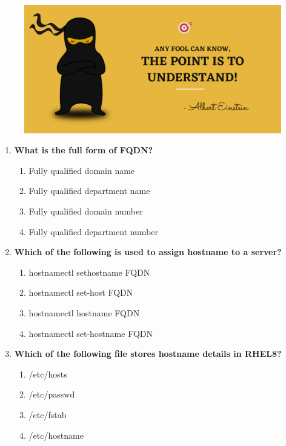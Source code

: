 \setlength{\columnsep}{3pt}
\begin{flushleft}
	
	\paragraph{}
	\bigskip
	
	\begin{figure}[h!]
		\centering
		\includegraphics[scale=.2]{content/practise.jpg}
	\end{figure}	
	\begin{enumerate}
		
		\item \textbf{What is the full form of FQDN?}
		\begin{enumerate}[label=(\alph*)]
			\item Fully qualified domain name  %
			\item Fully qualified department name
			\item Fully qualified domain number
			\item Fully qualified department number
		\end{enumerate}
		\bigskip
		\bigskip
		
		\item \textbf{Which of the following is used to assign hostname to a server?}
		\begin{enumerate}[label=(\alph*)]
			\item hostnamectl sethostname FQDN
			\item hostnamectl set-host FQDN
			\item hostnamectl hostname FQDN
			\item hostnamectl set-hostname FQDN  %
		\end{enumerate}
		\bigskip
		\bigskip	
		
		\item \textbf{Which of the following file stores hostname details in RHEL8?}
		\begin{enumerate}[label=(\alph*)]
			\item /etc/hosts
			\item /etc/passwd
			\item /etc/fstab   
			\item /etc/hostname  %
		\end{enumerate}
		\bigskip
		\bigskip	


\end{enumerate}
\end{flushleft}
